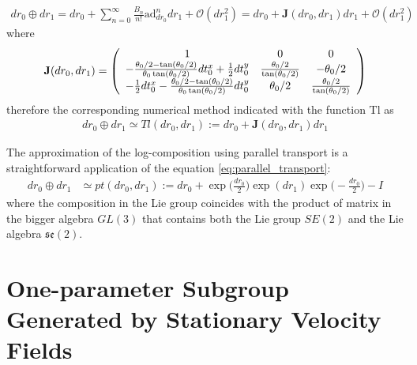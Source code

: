\begin{align}
dr_{0}\oplus dr_{1}
=
dr_{0}
+
\sum_{n=0}^{\infty} \frac{B_{n}}{n!} \text{ad}_{dr_{0}}^{ n} 
dr_{1}
+
\mathcal{O}(dr_{1}^2)
=
dr_{0}
+
\mathbf{J}(dr_{0}, dr_{1})
dr_{1}
+
\mathcal{O}(dr_{1}^2)
\end{align}
where 
\begin{align*}
\mathbf{J}(dr_{0}, dr_{1})
=
\left (
\begin{array} {c c c}
1            &  0        &      0
\\
-\frac{\theta_0/2 - \tan(\theta_0/2)}{\theta_0\tan(\theta_0/2)}  dt^{x}_0 + \frac{1}{2}dt^{y}_0       
&  \frac{\theta_0 /2}{\tan(\theta_0/2)} 
& - \theta_0/2 
\\
-  \frac{1}{2} dt^{x}_0 -\frac{\theta_0/2 - \tan(\theta_0/2)}{\theta_0\tan(\theta_0/2)} dt^{y}_0       
& \theta_0/2 
&  \frac{\theta_0 /2}{\tan(\theta_0/2)}
\end{array}
\right )
\end{align*}
therefore the corresponding numerical method indicated with the function $\text{Tl}$ as
\begin{align}\label{eq:taylor_se2}
dr_{0}\oplus dr_{1}
\simeq
Tl(dr_{0}, dr_{1})
:=
dr_{0}
+
\mathbf{J}(dr_{0}, dr_{1})
dr_{1}
\end{align}

The approximation of the log-composition using parallel transport is a straightforward application of the equation \ref{eq:parallel_transport}: 
\begin{align}\label{eq:parallel_transport_se2}
dr_{0}\oplus dr_{1}
&\simeq
pt(dr_{0}, dr_{1}) 
:=
dr_{0}
+
\exp\big(\frac{dr_{0}}{2}\big)   
\exp(dr_{1}) 
\exp\big(-\frac{dr_{0}}{2}\big)
-
I
\end{align}
where the composition in the Lie group coincides with the product of matrix in the bigger algebra $GL(3)$ that contains both the Lie group $SE(2)$ and the Lie algebra $\mathfrak{se}(2)$.


\section{One-parameter Subgroup Generated by Stationary Velocity Fields}\label{se:svf}

